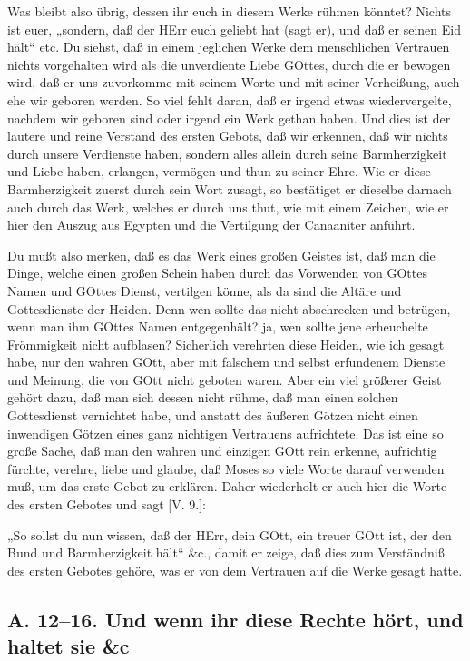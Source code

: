 Was bleibt also übrig, dessen ihr euch in diesem Werke rühmen könntet? Nichts ist euer, „sondern, daß der HErr euch geliebt hat (sagt er), und daß er seinen Eid hält“ etc. Du siehst, daß in einem jeglichen Werke dem menschlichen Vertrauen nichts vorgehalten wird als die unverdiente Liebe GOttes, durch die er bewogen wird, daß er uns zuvorkomme mit seinem Worte und mit seiner Verheißung, auch ehe wir geboren werden. So viel fehlt daran, daß er irgend etwas wiedervergelte, nachdem wir geboren sind oder irgend ein Werk gethan haben. Und dies ist der lautere und reine Verstand des ersten Gebots, daß wir erkennen, daß wir nichts durch unsere Verdienste haben, sondern alles allein durch seine Barmherzigkeit und Liebe haben, erlangen, vermögen und thun zu seiner Ehre. Wie er diese Barmherzigkeit zuerst durch sein Wort zusagt, so bestätiget er dieselbe darnach auch durch das Werk, welches er durch uns thut, wie mit einem Zeichen, wie er hier den Auszug aus Egypten und die Vertilgung der Canaaniter anführt.

Du mußt also merken, daß es das Werk eines großen Geistes ist, daß man die Dinge, welche einen großen Schein haben durch das Vorwenden von GOttes Namen und GOttes Dienst, vertilgen könne, als da sind die Altäre und Gottesdienste der Heiden. Denn wen sollte das nicht abschrecken und betrügen, wenn man ihm GOttes Namen entgegenhält? ja, wen sollte jene erheuchelte Frömmigkeit nicht aufblasen? Sicherlich verehrten diese Heiden, wie ich gesagt habe, nur den wahren GOtt, aber mit falschem und selbst erfundenem Dienste und Meinung, die von GOtt nicht geboten waren. Aber ein viel größerer Geist gehört dazu, daß man sich dessen nicht rühme, daß man einen solchen Gottesdienst vernichtet habe, und anstatt des äußeren Götzen nicht einen inwendigen Götzen eines ganz nichtigen Vertrauens aufrichtete. Das ist eine so große Sache, daß man den wahren und einzigen GOtt rein erkenne, aufrichtig fürchte, verehre, liebe und glaube, daß Moses so viele Worte darauf verwenden muß, um das erste Gebot zu erklären. Daher wiederholt er auch hier die Worte des ersten Gebotes und sagt [V. 9.]:

„So sollst du nun wissen, daß der HErr, dein GOtt, ein treuer GOtt ist, der den Bund und Barmherzigkeit hält“ \&c., damit er zeige, daß dies zum Verständniß des ersten Gebotes gehöre, was er von dem Vertrauen auf die Werke gesagt hatte.

\subsection{A. 12–16. Und wenn ihr diese Rechte hört, und haltet sie \&c}

